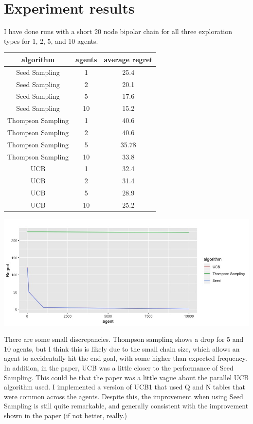 \documentclass{article}
\begin{document}
\section{Experiment results}
I have done runs with a short 20 node bipolar chain for all three exploration types for 1, 2, 5, and 10 agents.
\begin{tabular}{|c|c|c|}
\hline 
algorithm & agents & average regret \\ 
\hline 
Seed Sampling & 1 & 25.4 \\ 
\hline 
Seed Sampling&2&20.1 \\ 
\hline 
Seed Sampling&5&17.6 \\ 
\hline 
Seed Sampling&10&15.2 \\ 
\hline 
Thompson Sampling&1&40.6 \\ 
\hline 
Thompson Sampling&2&40.6  \\ 
\hline 
Thompson Sampling&5&35.78 \\ 
\hline 
Thompson Sampling&10&33.8  \\ 
\hline 
UCB&1&32.4  \\ 
\hline 
UCB&2&31.4 \\ 
\hline 
UCB&5&28.9 \\ 
\hline 
UCB&10&25.2 \\ 
\hline 
\end{tabular} 

\includegraphics[scale=.6]{results_pre.jpeg}

There are some small discrepancies. Thompson sampling shows a drop for 5 and 10 agents, but I think this is likely due to the small chain size, which allows an agent to accidentally hit the end goal, with some higher than expected frequency. In addition, in the paper, UCB was a little closer to the performance of Seed Sampling. This could be that the paper was a little vague about the parallel UCB algorithm used. I implemented a version of UCB1 that used Q and N tables that were common across the agents. Despite this, the improvement when using Seed Sampling is still quite remarkable, and generally consistent with the improvement shown in the paper (if not better, really.)
\end{document}
